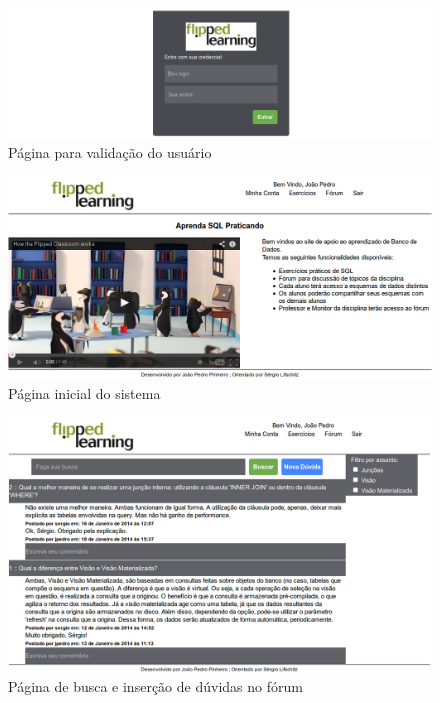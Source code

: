 \documentclass[graduacao,brazil]{ThesisPUC}
\begin{document}
\begin{figure}[H]
    \centering
    \includegraphics[width=\linewidth]{Imagens/login_page.png}
    \caption{P\'{a}gina para valida\c{c}\~{a}o do usu\'{a}rio}
\end{figure}

\begin{figure}[H]
    \centering
    \includegraphics[width=\linewidth]{Imagens/welcome_page.png}
    \caption{P\'{a}gina inicial do sistema}
\end{figure}

\begin{figure}[H]
    \centering
    \includegraphics[width=\linewidth]{Imagens/forum_page.png}
    \caption{P\'{a}gina de busca e inser\c{c}\~{a}o de d\'{u}vidas no f\'{o}rum}
\end{figure}
\end{document}
